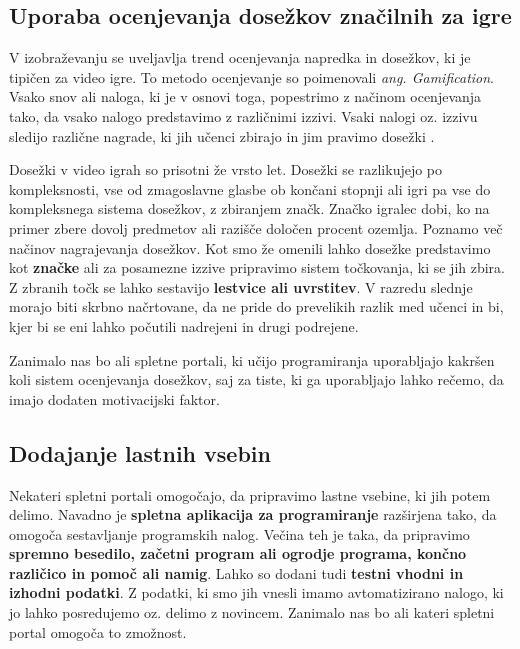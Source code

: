 \subsection{Uporaba ocenjevanja dosežkov značilnih za igre}
\label{sec:uporaba_dosežkov}

V izobraževanju se uveljavlja trend ocenjevanja napredka in dosežkov,
ki je tipičen za video igre. To metodo ocenjevanje so poimenovali
\emph{ang. Gamification}. Vsako snov ali naloga, ki je v osnovi toga,
popestrimo z načinom ocenjevanja tako, da vsako nalogo predstavimo z
različnimi izzivi. Vsaki nalogi oz. izzivu sledijo različne nagrade,
ki jih učenci zbirajo in jim pravimo dosežki \cite{web:edublogger}.

Dosežki v video igrah so prisotni že vrsto let. Dosežki se razlikujejo
po kompleksnosti, vse od zmagoslavne glasbe ob končani stopnji ali
igri pa vse do kompleksnega sistema dosežkov, z zbiranjem
značk. Značko igralec dobi, ko na primer zbere dovolj predmetov ali
razišče določen procent ozemlja. Poznamo več načinov nagrajevanja
dosežkov. Kot smo že omenili lahko dosežke predstavimo kot
\textbf{značke} ali za posamezne izzive pripravimo sistem točkovanja,
ki se jih zbira. Z zbranih točk se lahko sestavijo \textbf{lestvice
  ali uvrstitev}. V razredu slednje morajo biti skrbno načrtovane, da
ne pride do prevelikih razlik med učenci in bi, kjer bi se eni lahko
počutili nadrejeni in drugi podrejene.

Zanimalo nas bo ali spletne portali, ki učijo programiranja
uporabljajo kakršen koli sistem ocenjevanja dosežkov, saj za tiste, ki
ga uporabljajo lahko rečemo, da imajo dodaten motivacijski faktor.

\subsection{Dodajanje lastnih vsebin}
\label{sec:dodajanje_vsebin}

Nekateri spletni portali omogočajo, da pripravimo lastne vsebine, ki
jih potem delimo. Navadno je \textbf{spletna aplikacija za
  programiranje} razširjena tako, da omogoča sestavljanje programskih
nalog. Večina teh je taka, da pripravimo \textbf{spremno besedilo,
  začetni program ali ogrodje programa, končno različico in pomoč ali
  namig}. Lahko so dodani tudi \textbf{testni vhodni in izhodni
  podatki}. Z podatki, ki smo jih vnesli imamo avtomatizirano nalogo,
ki jo lahko posredujemo oz. delimo z novincem. Zanimalo nas bo ali
kateri spletni portal omogoča to zmožnost.

